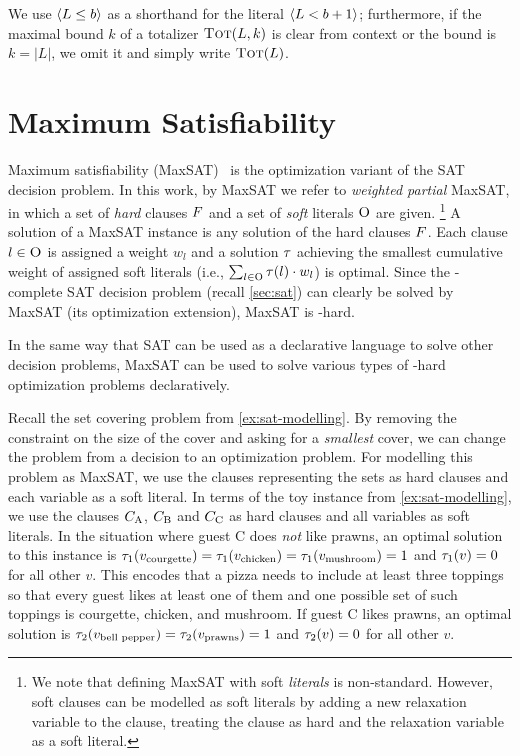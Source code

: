 We use $\langle L \leq b \rangle$ as a shorthand for the literal $\langle L < b+1 \rangle$;
furthermore, if the maximal bound $k$ of a totalizer $\textsc{Tot}(L,k)$ is clear from context or the bound is $k=|L|$, we omit it and simply write $\textsc{Tot}(L)$.

\section{Maximum Satisfiability\label{sec:max-sat}}

Maximum satisfiability (MaxSAT)~\autocite{handbook2-maxsat} is the optimization variant of the SAT decision problem.
In this work, by MaxSAT we refer to \emph{weighted partial} MaxSAT, in which a set of \emph{hard} clauses $F$ and a set of \emph{soft} literals $\textsc{O}$ are given.%
\footnote{We note that defining MaxSAT with soft \emph{literals} is non-standard. However, soft clauses can be modelled as soft literals by adding a new relaxation variable to the clause, treating the clause as hard and the relaxation variable as a soft literal.}
A solution of a MaxSAT instance is any solution of the hard clauses $F$.
Each clause $l \in \textsc{O}$ is assigned a weight $w_l$ and a solution $\tau$ achieving the smallest cumulative weight of assigned soft literals (i.e., $\sum_{l \in \textsc{O}} \tau(l) \cdot w_l$) is optimal.
Since the \NP-complete SAT decision problem (recall \cref{sec:sat}) can clearly be solved by MaxSAT (its optimization extension), MaxSAT is \NP-hard.

In the same way that SAT can be used as a declarative language to solve other decision problems, MaxSAT can be used to solve various types of \NP-hard optimization problems declaratively.

\begin{example}\label{ex:maxsat-modelling}
  Recall the set covering problem from \cref{ex:sat-modelling}.
  By removing the constraint on the size of the cover and asking for a \emph{smallest} cover, we can change the problem from a decision to an optimization problem.
  For modelling this problem as MaxSAT, we use the clauses representing the sets as hard clauses and each variable as a soft literal.
  In terms of the toy instance from \cref{ex:sat-modelling}, we use the clauses $C_\text{A}$, $C_\text{B}$ and $C_\text{C}$ as hard clauses and all variables as soft literals.
  In the situation where guest C does \emph{not} like prawns, an optimal solution to this instance is $\tau_1(v_\text{courgette}) = \tau_1(v_\text{chicken}) = \tau_1(v_\text{mushroom}) = 1$ and $\tau_1(v) = 0$ for all other $v$.
  This encodes that a pizza needs to include at least three toppings so that every guest likes at least one of them and one possible set of such toppings is courgette, chicken, and mushroom.
  If guest C likes prawns, an optimal solution is $\tau_2(v_\text{bell pepper}) = \tau_2(v_\text{prawns}) = 1$ and $\tau_2(v) = 0$ for all other $v$.
\end{example}

